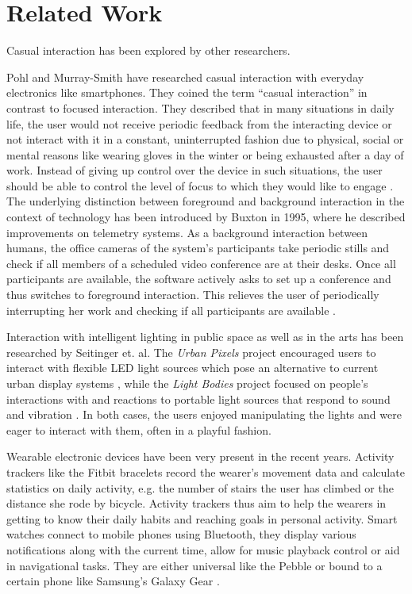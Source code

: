 \chapter{Related Work}
Casual interaction has been explored by other researchers.

Pohl and Murray-Smith have researched casual interaction with everyday electronics like smartphones. They coined the term ``casual interaction'' in contrast to focused interaction. They described that in many situations in daily life, the user would not receive periodic feedback from the interacting device or not interact with it in a constant, uninterrupted fashion due to physical, social or mental reasons like wearing gloves in the winter or being exhausted after a day of work. Instead of giving up control over the device in such situations, the user should be able to control the level of focus to which they would like to engage \cite{Pohl2013}. The underlying distinction between foreground and background interaction in the context of technology has been introduced by Buxton in 1995, where he described improvements on telemetry systems. As a background interaction between humans, the office cameras of the system's participants take periodic stills and check if all members of a scheduled video conference are at their desks. Once all participants are available, the software actively asks to set up a conference and thus switches to foreground interaction. This relieves the user of periodically interrupting her work and checking if all participants are available \cite{Buxton1995}.

Interaction with intelligent lighting in public space as well as in the arts has been researched by Seitinger et. al. The \textit{Urban Pixels} project encouraged users to interact with flexible \ac{LED} light sources which pose an alternative to current urban display systems \cite{Seitinger2009}, while the \textit{Light Bodies} project focused on people's interactions with and reactions to portable light sources that respond to sound and vibration \cite{Seitinger2010}. In both cases, the users enjoyed manipulating the lights and were eager to interact with them, often in a playful fashion.

Wearable electronic devices have been very present in the recent years. Activity trackers like the Fitbit bracelets \cite{fitbit} record the wearer's movement data and calculate statistics on daily activity, e.g. the number of stairs the user has climbed or the distance she rode by bicycle. Activity trackers thus aim to help the wearers in getting to know their daily habits and reaching goals in personal activity. Smart watches connect to mobile phones using Bluetooth, they display various notifications along with the current time, allow for music playback control or aid in navigational tasks. They are either universal like the Pebble \cite{pebble} or bound to a certain phone like Samsung's Galaxy Gear \cite{galaxygear}.

